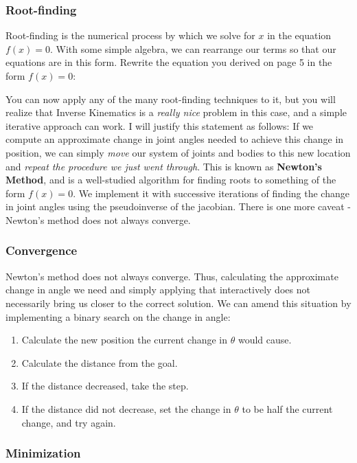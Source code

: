 \documentclass[]{article}
\begin{document}
\subsubsection{Root-finding}

Root-finding is the numerical process by which we solve for $x$ in the equation $f(x) = 0$. With some simple algebra, we can rearrange our terms so that our equations are in this form. Rewrite the equation you derived on page 5 in the form $f(x) = 0$:
\vspace{3cm}

You can now apply any of the many root-finding techniques to it, but you will realize that Inverse Kinematics is a \emph{really nice} problem in this case, and a simple iterative approach can work. I will justify this statement as follows: If we compute an approximate change in joint angles needed to achieve this change in position, we can simply \emph{move} our system of joints and bodies to this new location and \emph{repeat the procedure we just went through}. This is known as \textbf{Newton's Method}, and is a well-studied algorithm for finding roots to something of the form $f(x) = 0$. We implement it with successive iterations of finding the change in joint angles using the pseudoinverse of the jacobian. There is one more caveat - Newton's method does not always converge.

\subsubsection{Convergence}

Newton's method does not always converge. Thus, calculating the approximate change in angle we need and simply applying that interactively does not necessarily bring us closer to the correct solution. We can amend this situation by implementing a binary search on the change in angle:

\begin{enumerate}
    \item Calculate the new position the current change in $\theta$ would cause.
    \item Calculate the distance from the goal.
    \item If the distance decreased, take the step.
    \item If the distance did not decrease, set the change in $\theta$ to be half the current change, and try again.
\end{enumerate}

\subsubsection{Minimization}
\end{document}
